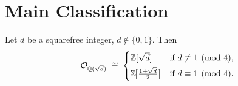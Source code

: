 \section{Main Classification}

\begin{theorem}[Classification of $\Od$]\label{thm:classification}
  \leanok
  Let $d$ be a squarefree integer, $d\notin\{0,1\}$.  Then
  \[
    \mathcal{O}_{\mathbb{Q}(\sqrt{d})} \;\cong\;
    \begin{cases}
      \mathbb{Z}[\sqrt{d}] & \text{if } d\not\equiv 1\pmod{4},\\[4pt]
      \mathbb{Z}\!\bigl[\tfrac{1+\sqrt{d}}{2}\bigr] & \text{if }
      d\equiv 1\pmod{4}.
    \end{cases}
  \]
\end{theorem}
